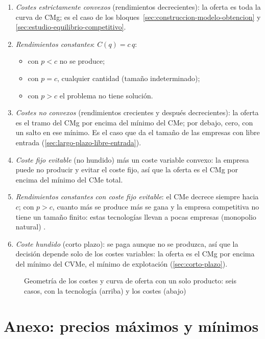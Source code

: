 \documentclass[11pt]{article}
\begin{document}
\begin{enumerate}
\item \emph{Costes estrictamente convexos} (rendimientos decrecientes): la oferta es toda la curva de CMg; es el caso de los bloques~\ref{sec:construccion-modelo-obtencion} y \ref{sec:estudio-equilibrio-competitivo}.
\item \emph{Rendimientos constantes}: $C(q)=c\,q$:
  \begin{itemize}
  \item con $p<c$ no se produce;
  \item con $p=c$, cualquier cantidad (tamaño indeterminado);
  \item con $p>c$ el problema no tiene solución.
  \end{itemize}
\item \emph{Costes no convexos} (rendimientos crecientes y después decrecientes): la oferta es el tramo del CMg por encima del mínimo del CMe; por debajo, cero, con un salto en ese mínimo. Es el caso que da el tamaño de las empresas con libre entrada (\ref{sec:largo-plazo-libre-entrada}).
\item \emph{Coste fijo evitable} (no hundido) más un coste variable convexo: la empresa puede no producir y evitar el coste fijo, así que la oferta es el CMg por encima del mínimo del CMe total.
\item \emph{Rendimientos constantes con coste fijo evitable}: el CMe decrece siempre hacia $c$; con $p>c$, cuanto más se produce más se gana y la empresa competitiva no tiene un tamaño finito: estas tecnologías llevan a pocas empresas (monopolio natural) .
\item \emph{Coste hundido} (corto plazo): se paga aunque no se produzca, así que la decisión depende solo de los costes variables: la oferta es el CMg por encima del mínimo del CVMe, el mínimo de explotación (\ref{sec:corto-plazo}).
\end{enumerate}

\begin{figure}[H]
\centering
\caption{Geometría de los costes y curva de oferta con un solo producto: seis casos, con la tecnología (arriba) y los costes (abajo)}\label{fig:geometria-costes}
\end{figure}

\section{Anexo: precios máximos y mínimos}\label{anexo:controles}
\end{document}
